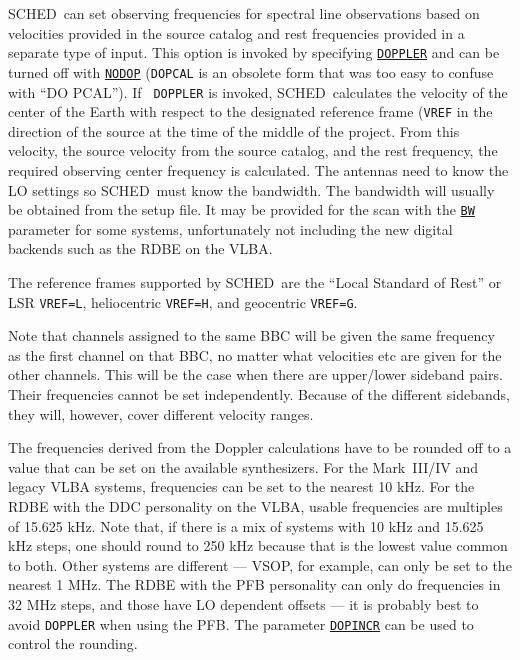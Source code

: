 \documentclass{report}
\newcommand{\schedb}{{\sc SCHED~}}
\begin{document}
\schedb can set observing frequencies for spectral line observations
based on velocities provided in the source catalog and rest
frequencies provided in a separate type of input. This option is
invoked by specifying 
{\hyperref[MP:DOPPLER]{{\tt DOPPLER}}} and can be
turned off with 
{\hyperref[MP:DOPPLER]{{\tt NODOP}}} ({\tt DOPCAL} is an
obsolete form that was too easy to confuse with ``DO PCAL'').  If {\tt
DOPPLER} is invoked, \schedb calculates the velocity of the center of
the Earth with respect to the designated reference frame ({\tt VREF}
in the direction of the source at the time of the middle of the
project. From this velocity, the source velocity from the source
catalog, and the rest frequency, the required observing center
frequency is calculated.  The antennas need to know the LO settings so
\schedb must know the bandwidth.  The bandwidth will usually be
obtained from the setup file.  It may be provided for the scan with
the 
{\hyperref[MP:BW]{{\tt BW}}} parameter for some systems, unfortunately
not including the new digital backends such as the RDBE on the VLBA.

The reference frames supported by \schedb are the ``Local Standard
of Rest'' or LSR {\tt VREF=L}, heliocentric {\tt VREF=H}, and
geocentric {\tt VREF=G}.

Note that channels assigned to the same BBC will be given the same
frequency as the first channel on that BBC, no matter what velocities
etc are given for the other channels.  This will be the case when
there are upper/lower sideband pairs.  Their frequencies cannot
be set independently.  Because of the different sidebands, they
will, however, cover different velocity ranges.

The frequencies derived from the Doppler calculations have to be
rounded off to a value that can be set on the available synthesizers.
For the Mark~III/IV and legacy VLBA systems, frequencies can be set to
the nearest 10 kHz.  For the RDBE with the DDC personality on the
VLBA, usable frequencies are multiples of 15.625 kHz.  Note that, if
there is a mix of systems with 10 kHz and 15.625 kHz steps, one should
round to 250 kHz because that is the lowest value common to both.
Other systems are different --- VSOP, for
example, can only be set to the nearest 1 MHz.  The RDBE with the
PFB personality can only do frequencies in 32 MHz steps, and those
have LO dependent offsets --- it is probably best to avoid {\tt DOPPLER}
when using the PFB.  The parameter
{\hyperref[MP:DOPINCR]{{\tt DOPINCR}}} can be used to control the rounding.
\end{document}
